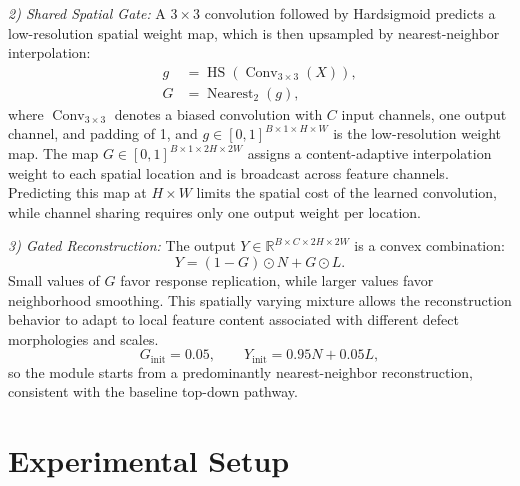 \documentclass[journal]{IEEEtranTIE}
\begin{document}
\emph{2) Shared Spatial Gate:}
A $3\times3$ convolution followed by Hardsigmoid predicts a low-resolution spatial weight map, which is then upsampled by nearest-neighbor interpolation:
\begin{align}
g &= \operatorname{HS}(\operatorname{Conv}_{3\times3}(X)), \label{eq:giu-gate-lowres}\\
G &= \operatorname{Nearest}_{2}(g), \label{eq:giu-gate}
\end{align}
where $\operatorname{Conv}_{3\times3}$ denotes a biased convolution with $C$ input channels, one output channel, and padding of 1, and $g\in[0,1]^{B\times1\times H\times W}$ is the low-resolution weight map. The map $G\in[0,1]^{B\times1\times2H\times2W}$ assigns a content-adaptive interpolation weight to each spatial location and is broadcast across feature channels. Predicting this map at $H\times W$ limits the spatial cost of the learned convolution, while channel sharing requires only one output weight per location.

\emph{3) Gated Reconstruction:}
The output $Y\in\mathbb{R}^{B\times C\times2H\times2W}$ is a convex combination:
\begin{equation}
Y=(1-G)\odot N+G\odot L.
\label{eq:giu-mixture}
\end{equation}
Small values of $G$ favor response replication, while larger values favor neighborhood smoothing. This spatially varying mixture allows the reconstruction behavior to adapt to local feature content associated with different defect morphologies and scales.
\begin{equation}
G_{\mathrm{init}}=0.05,\qquad Y_{\mathrm{init}}=0.95N+0.05L,
\label{eq:giu-initialization}
\end{equation}
so the module starts from a predominantly nearest-neighbor reconstruction, consistent with the baseline top-down pathway.

\section{Experimental Setup}
\label{sec:experimental-setup}
\end{document}
